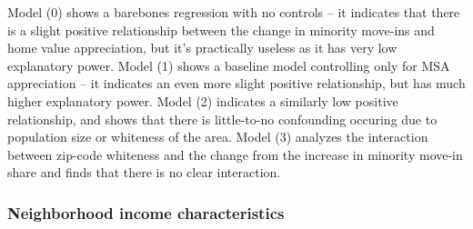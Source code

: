 \documentclass[11pt]{article}
\begin{document}
    Model (0) shows a barebones regression with no controls -- it indicates
that there is a slight positive relationship between the change in
minority move-ins and home value appreciation, but it's practically
useless as it has very low explanatory power. Model (1) shows a baseline
model controlling only for MSA appreciation -- it indicates an even more
slight positive relationship, but has much higher explanatory power.
Model (2) indicates a similarly low positive relationship, and shows
that there is little-to-no confounding occuring due to population size
or whiteness of the area. Model (3) analyzes the interaction between
zip-code whiteness and the change from the increase in minority move-in
share and finds that there is no clear interaction.

    \subsubsection{Neighborhood income
characteristics}\label{neighborhood-income-characteristics}
\end{document}

